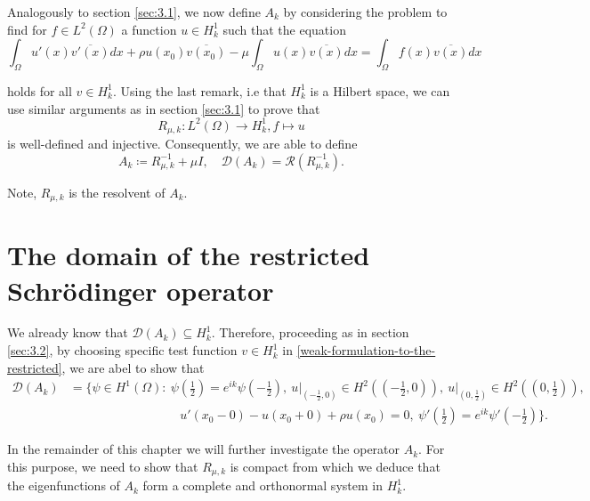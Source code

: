 Analogously to section \ref{sec:3.1}, we now define $A_{k}$ by considering the problem to find for $f \in L^{2}(\Omega)$ a function $u \in H^{1}_{k}$ such that the equation
	\begin{equation}
		\int_{\Omega} u'(x) \overline{v'(x)} dx + \rho u(x_{0}) \overline{v(x_{0})} - \mu \int_{\Omega} u(x) \overline{v(x)} dx = \int_{\Omega} f(x) \overline{v(x)} dx \label{weak-formulation-to-the-restricted}
	\end{equation}

holds for all $v \in H^{1}_{k}$. Using the last remark, i.e that $H^{1}_{k}$ is a Hilbert space, we can use similar arguments as in section \ref{sec:3.1} to prove that 
	\[ R_{\mu, k} \colon L^{2}(\Omega) \rightarrow H^{1}_{k},  f \mapsto u \]
is well-defined and injective. Consequently, we are able to define
	\[ A_{k} \coloneqq R_{\mu, k}^{-1} + \mu I, \quad \mathcal{D}(A_{k}) = \mathcal{R}(R_{\mu, k}^{-1}). \] 
	
\begin{remark}
	Note, $R_{\mu, k}$ is the resolvent of $A_{k}$.
\end{remark}

\section{The domain of the restricted Schrödinger operator}

We already know that $\mathcal{D}(A_{k}) \subseteq H^{1}_{k}$. Therefore, proceeding as in section \ref{sec:3.2}, by choosing specific test function $v \in H^{1}_{k}$ in \eqref{weak-formulation-to-the-restricted}, we are abel to show that %
\begin{align*}
	\mathcal{D}(A_{k}) & = \Big\{ \psi \in H^{1}(\Omega) \colon ~\psi\left(\frac{1}{2}\right) = e^{ik} \psi\left(-\frac{1}{2}\right), ~ u\big|_{\left(-\frac{1}{2}, 0\right)} \in H^{2}\left(\left(-\frac{1}{2}, 0\right)\right), ~ u\big|_{\left(0, \frac{1}{2}\right)} \in H^{2}\left(\left(0, \frac{1}{2}\right)\right),  \\
	& ~\qquad ~\qquad ~\qquad ~\qquad u'(x_{0}-0) - u(x_{0} + 0) + \rho u(x_{0}) = 0,  ~ \psi'\left(\frac{1}{2}\right) = e^{ik} \psi'\left(-\frac{1}{2}\right) \Big\}. 
\end{align*}


In the remainder of this chapter we will further investigate the operator $A_{k}$. For this purpose, we need to show that $R_{\mu, k}$ is compact from which we deduce that the eigenfunctions of $A_{k}$ form a complete and orthonormal system in $H^{1}_{k}$.

